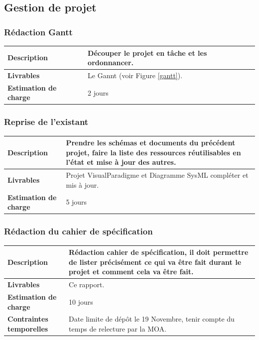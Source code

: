 
\subsection{Gestion de projet}

\subsubsection{Rédaction Gantt}

\begin{tabularx}{13cm}{lX}
    \toprule
        \textbf{Description} &
        Découper le projet en tâche et les ordonnancer. \\
    \midrule
        \textbf{Livrables} &
        Le Gannt (voir Figure \ref{gantt}). \\
    \midrule
        \textbf{Estimation de charge} &
        2 jours \\
    \bottomrule
\end{tabularx}

\subsubsection{Reprise de l'existant}

\begin{tabularx}{13cm}{lX}
    \toprule
        \textbf{Description} &
        Prendre les schémas et documents du précédent projet, faire la liste des ressources réutilisables en l'état et mise à jour des autres. \\
    \midrule
        \textbf{Livrables} &
        Projet VisualParadigme et Diagramme SysML compléter et mis à jour. \\
    \midrule
        \textbf{Estimation de charge} &
        5 jours \\
    \bottomrule
\end{tabularx}

\subsubsection{Rédaction du cahier de spécification}

\begin{tabularx}{13cm}{lX}
    \toprule
        \textbf{Description} &
        Rédaction cahier de spécification, il doit permettre de lister précisément ce qui va être fait durant le projet et comment cela va être fait. \\
    \midrule
        \textbf{Livrables} &
        Ce rapport. \\
    \midrule
        \textbf{Estimation de charge} &
        10 jours \\
    \midrule
        \textbf{Contraintes temporelles} &
        Date limite de dépôt le 19 Novembre, tenir compte du temps de relecture par la MOA. \\
    \bottomrule
\end{tabularx}

